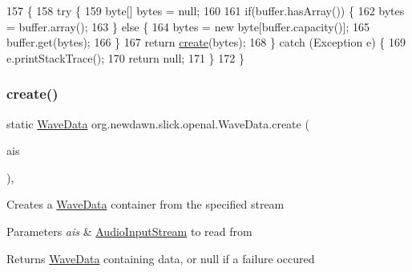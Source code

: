 \begin{DoxyCode}
157                                                      \{
158         \textcolor{keywordflow}{try} \{
159             byte[] bytes = null;
160             
161             \textcolor{keywordflow}{if}(buffer.hasArray()) \{
162                 bytes = buffer.array();
163             \} \textcolor{keywordflow}{else} \{
164                 bytes = \textcolor{keyword}{new} byte[buffer.capacity()];
165                 buffer.get(bytes);
166             \}
167             \textcolor{keywordflow}{return} \mbox{\hyperlink{classorg_1_1newdawn_1_1slick_1_1openal_1_1_wave_data_a8848866627bc92b5a94a59b800e8627c}{create}}(bytes);
168         \} \textcolor{keywordflow}{catch} (Exception e) \{
169             e.printStackTrace();
170             \textcolor{keywordflow}{return} null;
171         \}
172     \}   
\end{DoxyCode}
\mbox{\label{classorg_1_1newdawn_1_1slick_1_1openal_1_1_wave_data_a4ce1f90d7836a64815c2eaa4dd558e5e}} 
\subsubsection{\texorpdfstring{create()}{create()}\hspace{0.1cm}{\footnotesize\ttfamily [6/6]}}
{\footnotesize\ttfamily static \mbox{\hyperlink{classorg_1_1newdawn_1_1slick_1_1openal_1_1_wave_data}{Wave\+Data}} org.\+newdawn.\+slick.\+openal.\+Wave\+Data.\+create (\begin{DoxyParamCaption}\item[{\mbox{\hyperlink{interfaceorg_1_1newdawn_1_1slick_1_1openal_1_1_audio_input_stream}{Audio\+Input\+Stream}}}]{ais }\end{DoxyParamCaption})\hspace{0.3cm}{\ttfamily [inline]}, {\ttfamily [static]}}

Creates a \mbox{\hyperlink{classorg_1_1newdawn_1_1slick_1_1openal_1_1_wave_data}{Wave\+Data}} container from the specified stream


\begin{DoxyParams}{Parameters}
{\em ais} & \mbox{\hyperlink{interfaceorg_1_1newdawn_1_1slick_1_1openal_1_1_audio_input_stream}{Audio\+Input\+Stream}} to read from \\
\hline
\end{DoxyParams}
\begin{DoxyReturn}{Returns}
\mbox{\hyperlink{classorg_1_1newdawn_1_1slick_1_1openal_1_1_wave_data}{Wave\+Data}} containing data, or null if a failure occured 
\end{DoxyReturn}

